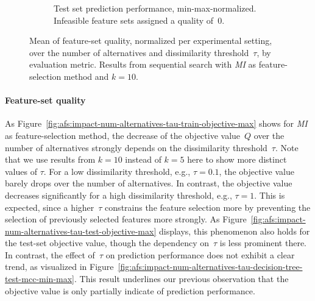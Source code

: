 \documentclass{article}
\theoremstyle{definition}
\begin{document}
\begin{figure}[p]
\begin{subfigure}[t]{0.48\textwidth}
		\caption{
			Test set prediction performance, min-max-normalized.
			Infeasible feature sets assigned a quality of~0.
		}
		\label{fig:afs:impact-num-alternatives-tau-decision-tree-test-mcc-min-max-fillna}
	\end{subfigure}
	\caption{
		Mean of feature-set quality, normalized per experimental setting, over the number of alternatives and dissimilarity threshold~$\tau$, by evaluation metric.
		Results from sequential search with \emph{MI} as feature-selection method and $k=10$.
	}
	\label{fig:afs:impact-num-alternatives-tau-quality}
\end{figure}

\paragraph{Feature-set quality}

As Figure~\ref{fig:afs:impact-num-alternatives-tau-train-objective-max} shows for \emph{MI} as feature-selection method, the decrease of the objective value~$Q$ over the number of alternatives strongly depends on the dissimilarity threshold~$\tau$.
Note that we use results from $k=10$ instead of $k=5$ here to show more distinct values of $\tau$.
For a low dissimilarity threshold, e.g., $\tau=0.1$, the objective value barely drops over the number of alternatives.
In contrast, the objective value decreases significantly for a high dissimilarity threshold, e.g., $\tau=1$.
This is expected, since a higher~$\tau$ constrains the feature selection more by preventing the selection of previously selected features more strongly.
As Figure~\ref{fig:afs:impact-num-alternatives-tau-test-objective-max} displays, this phenomenon also holds for the test-set objective value, though the dependency on~$\tau$ is less prominent there.
In contrast, the effect of~$\tau$ on prediction performance does not exhibit a clear trend, as visualized in Figure~\ref{fig:afs:impact-num-alternatives-tau-decision-tree-test-mcc-min-max}.
This result underlines our previous observation that the objective value is only partially indicate of prediction performance.
\end{document}
